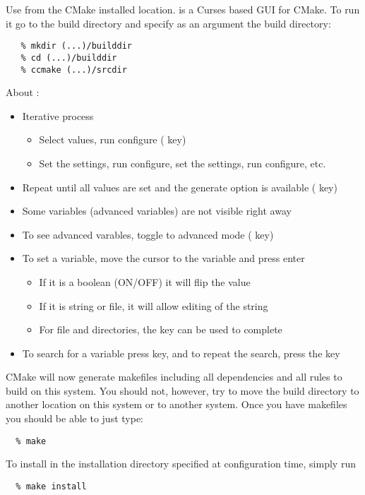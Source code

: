 Use  from the CMake installed location.  is a
Curses based GUI for CMake.  To run it go to the build directory and
specify as an argument the build directory:
\begin{verbatim}
   % mkdir (...)/builddir
   % cd (...)/builddir
   % ccmake (...)/srcdir
\end{verbatim}

About :
\begin{itemize}
\item  Iterative process
  \begin{itemize}
  \item Select values, run configure ( key)
  \item Set the settings, run configure, set the settings, run configure, etc. 
  \end{itemize}
\item Repeat until all values are set and the generate option is available ( key)
\item Some variables (advanced variables) are not visible right away
\item To see advanced varables, toggle to advanced mode ( key)
\item To set a variable, move the cursor to the variable and press enter
  \begin{itemize}
  \item If it is a boolean (ON/OFF) it will flip the value
  \item If it is string or file, it will allow editing of the string
  \item For file and directories, the  key can be used to complete 
  \end{itemize}
\item To search for a variable press \id{/} key, and to repeat the search, press the
 key
\end{itemize}

CMake will now generate makefiles including all dependencies and all rules to build 
{\sundials} on this system. You should not, however, try to move the build directory 
to another location on this system or to another system.
Once you have makefiles you should be able to just type: 
\begin{verbatim}
  % make
\end{verbatim}
To install {\sundials} in the installation directory specified at configuration time, simply run
\begin{verbatim}
  % make install
\end{verbatim}

